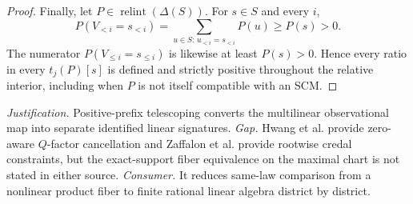 \documentclass{article}
\begin{document}
\begin{proof}
Finally, let \(P\in\operatorname{relint}(\Delta(S))\).  For \(s\in S\) and every \(i\),
\[
P(V_{<i}=s_{<i})
=\sum_{u\in S:\,u_{<i}=s_{<i}}P(u)
\ge P(s)>0.                                                    \tag{15}
\]
The numerator \(P(V_{\le i}=s_{\le i})\) is likewise at least \(P(s)>0\).  Hence every ratio in every \(t_j(P)[s]\) is defined and strictly positive throughout the relative interior, including when \(P\) is not itself compatible with an SCM.
\end{proof}
\par\smallskip\noindent \textit{Justification.} Positive-prefix telescoping converts the multilinear observational map into separate identified linear signatures. \textit{Gap.} Hwang et al. provide zero-aware \(Q\)-factor cancellation and Zaffalon et al. provide rootwise credal constraints, but the exact-support fiber equivalence on the maximal chart is not stated in either source. \textit{Consumer.} It reduces same-law comparison from a nonlinear product fiber to finite rational linear algebra district by district.
\end{document}
